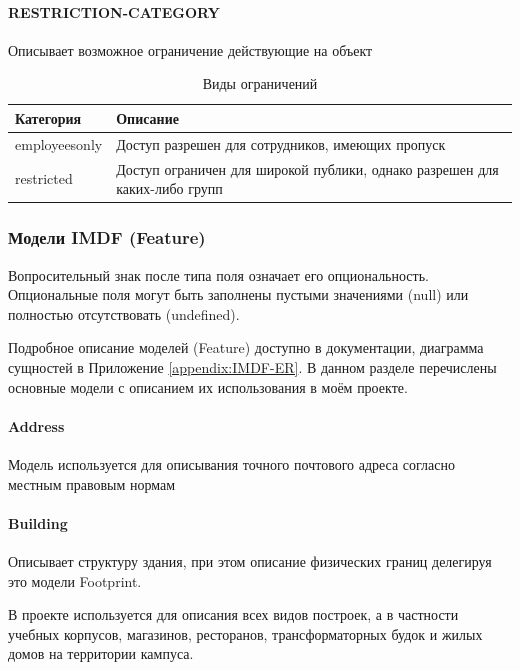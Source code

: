         \paragraph{RESTRICTION-CATEGORY}
          Описывает возможное ограничение действующие на объект
          \begin{center}
            \begin{xltabular}{\linewidth}{|l|X|}
              \caption{Виды ограничений}\\\hline
              Категория     & Описание                                                                   \\\hline
              employeesonly & Доступ разрешен для сотрудников, имеющих пропуск                            \\\hline
              restricted    & Доступ ограничен для широкой публики, однако разрешен для каких-либо групп \\\hline
            \end{xltabular}
          \end{center}

      \subsubsection{Модели IMDF (Feature)}
        Вопросительный знак после типа поля означает его опциональность. Опциональные поля могут быть заполнены пустыми значениями (null) или полностью отсутствовать (undefined).

        Подробное описание моделей (Feature) доступно в документации\cite{IMDFFeatures}, диаграмма сущностей в Приложение \ref{appendix:IMDF-ER}. В данном разделе перечислены основные модели с описанием их использования в моём проекте.
        \paragraph{Address}
          Модель используется для описывания точного почтового адреса согласно местным правовым нормам

        \paragraph{Building}
          Описывает структуру здания, при этом описание физических границ делегируя это модели Footprint.

          В проекте используется для описания всех видов построек, а в частности учебных корпусов, магазинов, ресторанов, трансформаторных будок и жилых домов на территории кампуса.

